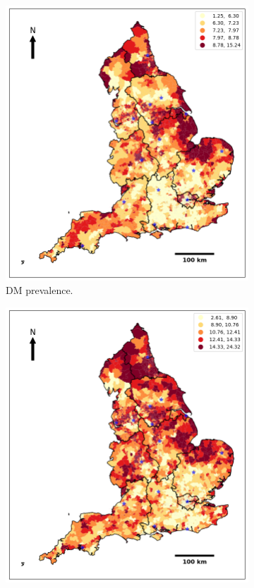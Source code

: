 \begin{figure}[ht]
\centering
\begin{subfigure}{.4\textwidth}
  \centering
  \includegraphics[width=1\linewidth]{ucl-latex-thesis-templates-master/Image/datageo_DMprev_5.png}
  \caption{DM prevalence.}
  \label{fig:A4.31}
\end{subfigure}%
\begin{subfigure}{.4\textwidth}
  \centering
  \includegraphics[width=1\linewidth]{ucl-latex-thesis-templates-master/Image/datageo_OBprev_6.png}

\end{subfigure}
\end{figure}
